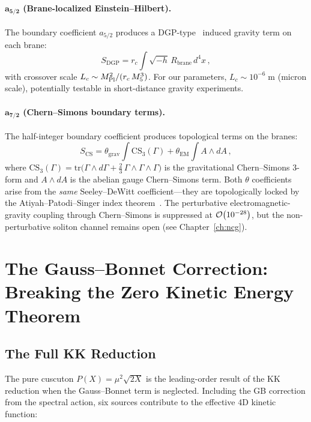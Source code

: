 \paragraph{$\bm{a_{5/2}}$ (Brane-localized Einstein--Hilbert).} The boundary coefficient $a_{5/2}$ produces a DGP-type~\cite{ch1:dgp} induced gravity term on each brane:
\begin{equation}
\label{eq:1-dgp}
S_{\mathrm{DGP}} = r_c \int \sqrt{-h}\, R_{\mathrm{brane}}\, d^4x\,,
\end{equation}
with crossover scale $L_c \sim M_{\mathrm{Pl}}^2/(r_c\, M_5^3)$. For our parameters, $L_c \sim 10^{-6}\;\mathrm{m}$ (micron scale), potentially testable in short-distance gravity experiments.

\paragraph{$\bm{a_{7/2}}$ (Chern--Simons boundary terms).} The half-integer boundary coefficient produces topological terms on the branes:
\begin{equation}
\label{eq:1-cs-terms}
S_{\mathrm{CS}} = \theta_{\mathrm{grav}} \int \mathrm{CS}_3(\Gamma) + \theta_{\mathrm{EM}} \int A \wedge dA\,,
\end{equation}
where $\mathrm{CS}_3(\Gamma) = \mathrm{tr}\bigl(\Gamma \wedge d\Gamma + \tfrac{2}{3}\, \Gamma \wedge \Gamma \wedge \Gamma\bigr)$ is the gravitational Chern--Simons 3-form and $A \wedge dA$ is the abelian gauge Chern--Simons term. Both $\theta$ coefficients arise from the \emph{same} Seeley--DeWitt coefficient---they are topologically locked by the Atiyah--Patodi--Singer index theorem~\cite{ch1:aps75}. The perturbative electromagnetic-gravity coupling through Chern--Simons is suppressed at $\mathcal{O}\!\left(10^{-28}\right)$, but the non-perturbative soliton channel remains open (see Chapter~\ref{ch:ncg}).


\section{The Gauss--Bonnet Correction: Breaking the Zero Kinetic Energy Theorem}
\label{sec:1-gbbreak}

\subsection{The Full KK Reduction}
\label{sec:1-full-kk}

The pure cuscuton $P(X) = \mu^2\sqrt{2X}$ is the leading-order result of the KK reduction when the Gauss--Bonnet term is neglected. Including the GB correction from the spectral action, six sources contribute to the effective 4D kinetic function:

